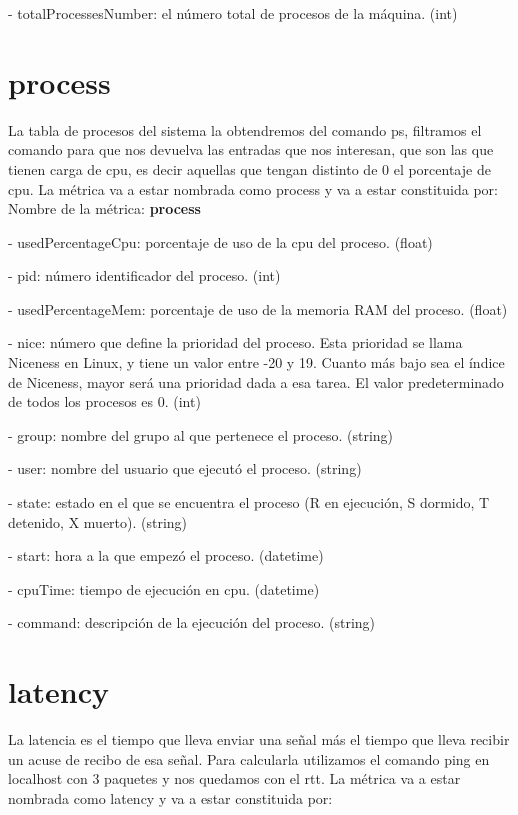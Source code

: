 \documentclass[ spanish, a4paper, 12pt, twoside]{report}
\begin{document}
\hyp{} totalProcessesNumber: el número total de procesos de la máquina. (int)

\section{process}
La tabla de procesos del sistema la obtendremos del comando ps, filtramos el comando para que nos devuelva 
las entradas que nos interesan, que son las que tienen carga de cpu, es decir aquellas que tengan distinto de 0 el porcentaje de cpu.
La métrica va a estar nombrada como process y va a estar constituida por:\\
  
Nombre de la métrica: \textbf{process}
  
\hyp{} usedPercentageCpu: porcentaje de uso de la cpu del proceso. (float)

\hyp{} pid: número identificador del proceso. (int)
  
\hyp{} usedPercentageMem: porcentaje de uso de la memoria RAM del proceso. (float)
  
\hyp{} nice: número que define la prioridad del proceso. Esta prioridad se llama Niceness en Linux, 
y tiene un valor entre -20 y 19. Cuanto más bajo sea el índice de Niceness, mayor será una prioridad dada a esa tarea.
El valor predeterminado de todos los procesos es 0. (int)

\hyp{} group: nombre del grupo al que pertenece el proceso. (string)

\hyp{} user: nombre del usuario que ejecutó el proceso. (string)

\hyp{} state: estado en el que se encuentra el proceso (R en ejecución, S dormido, T detenido, X muerto). (string)

\hyp{} start: hora a la que empezó el proceso. (datetime)
  
\hyp{} cpuTime: tiempo de ejecución en cpu. (datetime)
  
\hyp{} command: descripción de la ejecución del proceso. (string)


\section{latency}
La latencia es el tiempo que lleva enviar una señal más el tiempo que lleva recibir un acuse de recibo de esa señal.
Para calcularla utilizamos el comando ping en localhost con 3 paquetes y nos quedamos con el rtt. 
La métrica va a estar nombrada como latency y va a estar constituida por:\\
  
\end{document}
